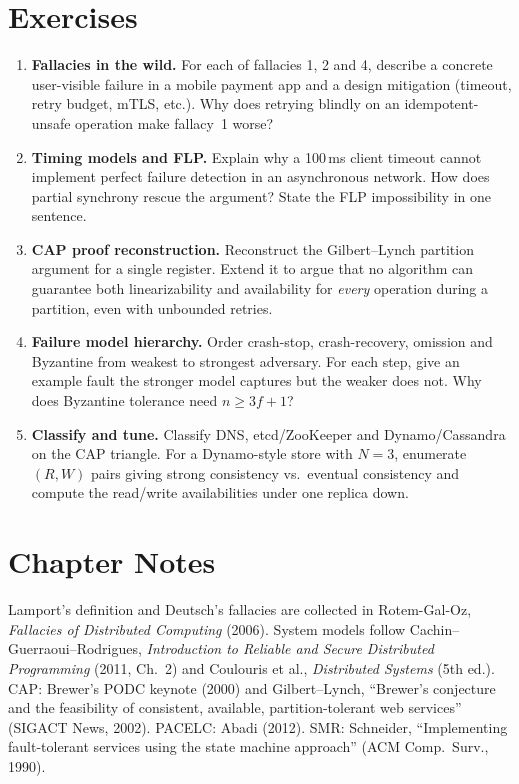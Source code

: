 \section{Exercises}
\label{sec:ch01-exercises}
\begin{enumerate}[label=E1.\arabic*, leftmargin=*, itemsep=0.6em]
    \item \textbf{Fallacies in the wild.} For each of fallacies 1, 2 and 4, describe a concrete user-visible failure in a mobile payment app and a design mitigation (timeout, retry budget, mTLS, etc.). Why does retrying blindly on an idempotent-unsafe operation make fallacy~1 worse?
    \item \textbf{Timing models and FLP.} Explain why a 100\,ms client timeout cannot implement perfect failure detection in an asynchronous network. How does partial synchrony rescue the argument? State the FLP impossibility in one sentence.
    \item \textbf{CAP proof reconstruction.} Reconstruct the Gil\-bert--Lynch partition argument for a single register. Extend it to argue that no algorithm can guarantee both linearizability and availability for \emph{every} operation during a partition, even with unbounded retries.
    \item \textbf{Failure model hierarchy.} Order crash-stop, crash-recovery, omission and Byzantine from weakest to strongest adversary. For each step, give an example fault the stronger model captures but the weaker does not. Why does Byzantine tolerance need $n\ge 3f+1$?
    \item \textbf{Classify and tune.} Classify DNS, etcd/ZooKeeper and Dynamo/Cassandra on the CAP triangle. For a Dynamo-style store with $N=3$, enumerate $(R,W)$ pairs giving strong consistency vs.\ eventual consistency and compute the read/write availabilities under one replica down.
\end{enumerate}

\section*{Chapter Notes}
Lamport's definition and Deutsch's fallacies are collected in Rotem-Gal-Oz, \emph{Fallacies of Distributed Computing} (2006). System models follow Cachin--Guerraoui--Rodrigues, \emph{Introduction to Reliable and Secure Distributed Programming} (2011, Ch.~2) and Coulouris et al., \emph{Distributed Systems} (5th ed.). CAP: Brewer's PODC keynote (2000) and Gilbert--Lynch, ``Brewer's conjecture and the feasibility of consistent, available, partition-tolerant web services'' (SIGACT News, 2002). PACELC: Abadi (2012). SMR: Schneider, ``Implementing fault-tolerant services using the state machine approach'' (ACM Comp.~Surv., 1990).


